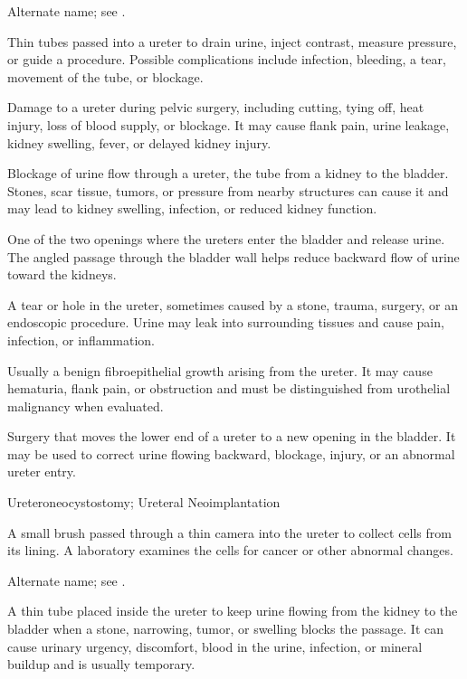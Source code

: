  Alternate name; see .

 Thin tubes passed into a ureter to drain urine, inject contrast, measure pressure, or guide a procedure. Possible complications include infection, bleeding, a tear, movement of the tube, or blockage.

 Damage to a ureter during pelvic surgery, including cutting, tying off, heat injury, loss of blood supply, or blockage. It may cause flank pain, urine leakage, kidney swelling, fever, or delayed kidney injury.

 Blockage of urine flow through a ureter, the tube from a kidney to the bladder. Stones, scar tissue, tumors, or pressure from nearby structures can cause it and may lead to kidney swelling, infection, or reduced kidney function.

 One of the two openings where the ureters enter the bladder and release urine. The angled passage through the bladder wall helps reduce backward flow of urine toward the kidneys.

 A tear or hole in the ureter, sometimes caused by a stone, trauma, surgery, or an endoscopic procedure. Urine may leak into surrounding tissues and cause pain, infection, or inflammation.

 Usually a benign fibroepithelial growth arising from the ureter. It may cause hematuria, flank pain, or obstruction and must be distinguished from urothelial malignancy when evaluated.

 Surgery that moves the lower end of a ureter to a new opening in the bladder. It may be used to correct urine flowing backward, blockage, injury, or an abnormal ureter entry.

\synonyms
Ureteroneocystostomy; Ureteral Neoimplantation

 A small brush passed through a thin camera into the ureter to collect cells from its lining. A laboratory examines the cells for cancer or other abnormal changes.

 Alternate name; see .

 A thin tube placed inside the ureter to keep urine flowing from the kidney to the bladder when a stone, narrowing, tumor, or swelling blocks the passage. It can cause urinary urgency, discomfort, blood in the urine, infection, or mineral buildup and is usually temporary.


